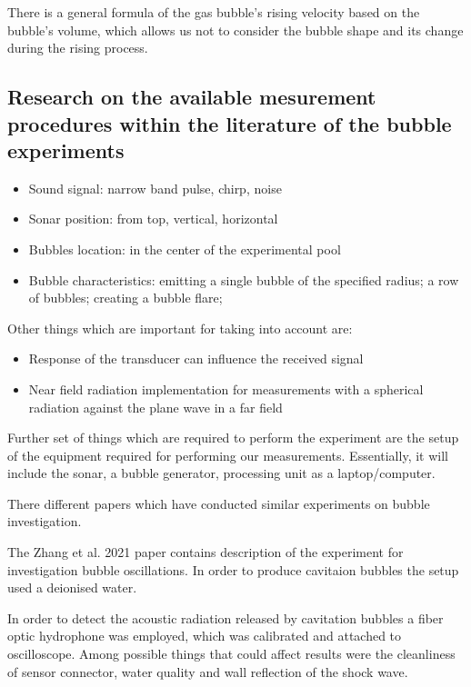 \documentclass[11pt]{article}
\begin{document}
There is a general formula of the gas bubble's rising velocity based on the bubble's volume, which allows us not to consider the bubble shape and its change during the rising process.



\subsection*{Research on the available mesurement procedures within the literature of the bubble experiments}

\begin{itemize}
    \item  Sound signal: narrow band pulse, chirp, noise
    \item Sonar position: from top, vertical, horizontal
    \item Bubbles location: in the center of the experimental pool
   \item Bubble characteristics: emitting a single bubble of the specified radius; a row of bubbles; 
   creating a bubble flare;
\end{itemize}
Other things which are important for taking into account are:
\begin{itemize}
    \item Response of the transducer can influence the received signal
    \item Near field radiation implementation for measurements with a spherical radiation against the plane wave in a far field
\end{itemize}

Further set of things which are required to perform the experiment are the setup of the equipment required for performing our measurements. 
Essentially, it will include the sonar, a bubble generator, processing unit as a laptop/computer.

There different papers which have conducted similar experiments on bubble investigation. 

The Zhang et al. 2021 \cite{zhang_experimental_2021} paper contains description of the experiment for investigation bubble oscillations. In order to produce cavitaion bubbles the setup used a deionised water.

In order to detect the acoustic radiation released by cavitation bubbles a fiber optic hydrophone was employed, which was calibrated and attached to oscilloscope.  
Among possible things that could affect results were the cleanliness of sensor connector, water quality and wall reflection of the shock wave.
\end{document}
